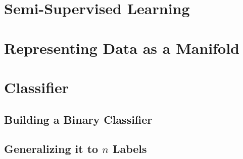 \section{Semi-Supervised Learning}

\section{Representing Data as a Manifold}

\section{Classifier}
\subsection{Building a Binary Classifier}

\subsection{Generalizing it to $n$ Labels}